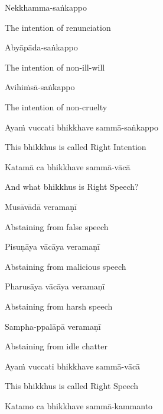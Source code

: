 Nekkhamma-saṅkappo

\begin{english}
  The intention of renunciation
\end{english}

Abyāpāda-saṅkappo

\begin{english}
  The intention of non-ill-will
\end{english}

Avihiṁsā-saṅkappo

\begin{english}
  The intention of non-cruelty
\end{english}

Ayaṁ vuccati bhikkhave sammā-saṅkappo

\begin{english}
  This bhikkhus is called Right Intention
\end{english}

\ifbfive\clearpage\fi
\ifafive\clearpage\fi

Katamā ca bhikkhave sammā-vācā

\begin{english}
  And what bhikkhus is Right Speech?
\end{english}

Musāvādā veramaṇī

\begin{english}
  Abstaining from false speech
\end{english}

Pisuṇāya vācāya veramaṇī

\begin{english}
  Abstaining from malicious speech
\end{english}

Pharusāya vācāya veramaṇī

\begin{english}
  Abstaining from harsh speech
\end{english}

Sampha-ppalāpā veramaṇī

\begin{english}
  Abstaining from idle chatter
\end{english}

Ayaṁ vuccati bhikkhave sammā-vācā

\begin{english}
  This bhikkhus is called Right Speech
\end{english}

Katamo ca bhikkhave sammā-kammanto

